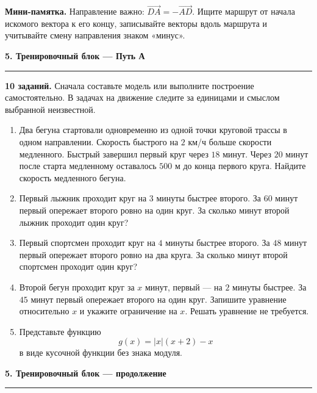\documentclass[a4paper,12pt]{article}
\newcommand{\sectiontitle}[1]{%
  \vspace{2mm}%
  {\Large\bfseries\color{darkaccent}#1}\par\vspace{2mm}%
  {\color{accent!55}\rule{\linewidth}{0.6pt}}\par\vspace{2mm}%
}
\newcommand{\vect}[2]{\overrightarrow{#1#2}}
\begin{document}
\textbf{Мини-памятка.} Направление важно: $\vect{D}{A}=-\vect{A}{D}$. Ищите маршрут от начала искомого вектора к его концу, записывайте векторы вдоль маршрута и учитывайте смену направления знаком «минус».

\clearpage

\sectiontitle{5. Тренировочный блок — Путь А}

\textbf{10 заданий.} Сначала составьте модель или выполните построение самостоятельно. В задачах на движение следите за единицами и смыслом выбранной неизвестной.

\begin{enumerate}[label=\textbf{\arabic*.}]
  \item Два бегуна стартовали одновременно из одной точки круговой трассы в одном направлении. Скорость быстрого на $2$ км/ч больше скорости медленного. Быстрый завершил первый круг через $18$ минут. Через $20$ минут после старта медленному оставалось $500$ м до конца первого круга. Найдите скорость медленного бегуна.

  \item Первый лыжник проходит круг на $3$ минуты быстрее второго. За $60$ минут первый опережает второго ровно на один круг. За сколько минут второй лыжник проходит один круг?

  \item Первый спортсмен проходит круг на $4$ минуты быстрее второго. За $48$ минут первый опережает второго ровно на два круга. За сколько минут второй спортсмен проходит один круг?

  \item Второй бегун проходит круг за $x$ минут, первый --- на $2$ минуты быстрее. За $45$ минут первый опережает второго на один круг. Запишите уравнение относительно $x$ и укажите ограничение на $x$. Решать уравнение не требуется.

  \item Представьте функцию
  \[
  g(x)=|x|(x+2)-x
  \]
  в виде кусочной функции без знака модуля.
\end{enumerate}

\clearpage

\sectiontitle{5. Тренировочный блок — продолжение}
\end{document}
